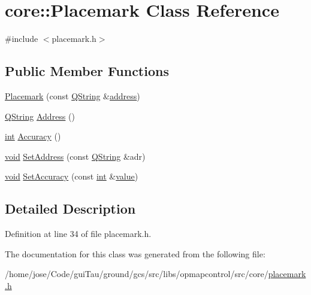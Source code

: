 \hypertarget{classcore_1_1_placemark}{\section{core\-:\-:Placemark Class Reference}
\label{classcore_1_1_placemark}
}


{\ttfamily \#include $<$placemark.\-h$>$}

\subsection*{Public Member Functions}
\begin{DoxyCompactItemize}
\item 
\hyperlink{group___o_p_map_widget_gab9298de24074616417ed9c9eee1e3fcc}{Placemark} (const \hyperlink{group___u_a_v_objects_plugin_gab9d252f49c333c94a72f97ce3105a32d}{Q\-String} \&\hyperlink{glext_8h_a86e3d190561a4ae1e195e1a2bcc83db5}{address})
\item 
\hyperlink{group___u_a_v_objects_plugin_gab9d252f49c333c94a72f97ce3105a32d}{Q\-String} \hyperlink{group___o_p_map_widget_ga6954c8bd25b9e37d34b49c03a88a33db}{Address} ()
\item 
\hyperlink{ioapi_8h_a787fa3cf048117ba7123753c1e74fcd6}{int} \hyperlink{group___o_p_map_widget_ga35e7221f35ac45cd6b658ec7aaefe9f0}{Accuracy} ()
\item 
\hyperlink{group___u_a_v_objects_plugin_ga444cf2ff3f0ecbe028adce838d373f5c}{void} \hyperlink{group___o_p_map_widget_gab54288ead0f6c2ce83424449ae9c0fe9}{Set\-Address} (const \hyperlink{group___u_a_v_objects_plugin_gab9d252f49c333c94a72f97ce3105a32d}{Q\-String} \&adr)
\item 
\hyperlink{group___u_a_v_objects_plugin_ga444cf2ff3f0ecbe028adce838d373f5c}{void} \hyperlink{group___o_p_map_widget_gaf3816263edb9fd676defbb9332a69624}{Set\-Accuracy} (const \hyperlink{ioapi_8h_a787fa3cf048117ba7123753c1e74fcd6}{int} \&\hyperlink{glext_8h_aa0e2e9cea7f208d28acda0480144beb0}{value})
\end{DoxyCompactItemize}


\subsection{Detailed Description}


Definition at line 34 of file placemark.\-h.



The documentation for this class was generated from the following file\-:\begin{DoxyCompactItemize}
\item 
/home/jose/\-Code/gui\-Tau/ground/gcs/src/libs/opmapcontrol/src/core/\hyperlink{placemark_8h}{placemark.\-h}\end{DoxyCompactItemize}
